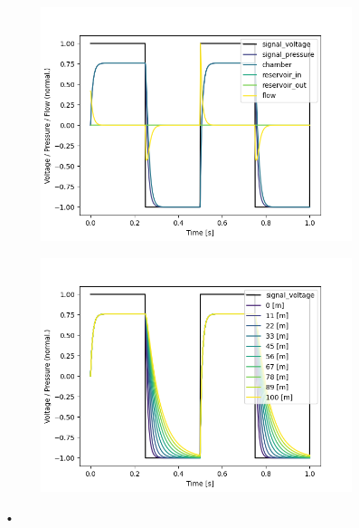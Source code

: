 \documentclass[fontsize=12pt, a4paper]{scrartcl}
\begin{document}
\begin{figure}[H]
	\centering
	\begin{subfigure}[H]{0.48\textwidth}
		\includegraphics[width=\textwidth, valign=t]{bilder/tubelength/tl_in_branch_singlesweep.png}
	\end{subfigure}
	\begin{subfigure}[H]{0.48\textwidth}
		\includegraphics[width=\textwidth, valign=t]{bilder/tubelength/tl_in_branch_multisweep.png}
	\end{subfigure}
	\caption{•}
\end{figure}
\end{document}
